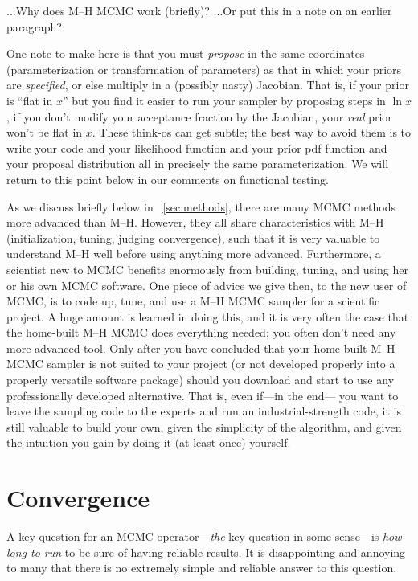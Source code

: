 \documentclass[12pt,twoside,pdftex]{article}
\begin{document}
...Why does M--H MCMC work (briefly)? ...Or put this in a note on an earlier paragraph?

One note to make here
  is that you must \emph{propose}
  in the same coordinates (parameterization or transformation of parameters)
  as that in which your priors are \emph{specified},
  or else multiply in a (possibly nasty) Jacobian.
That is, if your prior is ``flat in $x$''
  but you find it easier to run your sampler by proposing steps in $\ln x$,
  if you don't modify your acceptance fraction by the Jacobian,
  your \emph{real} prior won't be flat in $x$.
These think-os can get subtle;
  the best way to avoid them
  is to write your code and your likelihood function
  and your prior pdf function and your proposal distribution
  all in precisely the same parameterization.
We will return to this point below in our comments on functional testing.

As we discuss briefly below in \sectionname~\ref{sec:methods},
  there are many MCMC methods more advanced than M--H.
However, they all share characteristics with M--H
  (initialization, tuning, judging convergence),
  such that it is very valuable to understand M--H well before using anything more advanced.
Furthermore, a scientist new to MCMC benefits enormously from
  building, tuning, and using her or his own MCMC software.
One piece of advice we give then,
  to the new user of MCMC,
  is to code up, tune, and use a M--H MCMC sampler for a scientific project.
A huge amount is learned in doing this,
  and it is very often the case that the home-built M--H MCMC does everything needed;
  you often don't need any more advanced tool.
Only after you have concluded that your home-built M--H MCMC sampler
  is not suited to your project
  (or not developed properly into a properly versatile software package)
  should you download and start to use any professionally developed alternative.
That is, even if---in the end---%
  you want to leave the sampling code to the experts and run an industrial-strength code,
  it is still valuable to build your own,
  given the simplicity of the algorithm,
  and given the intuition you gain by doing it (at least once) yourself.

\section{Convergence}

A key question for an MCMC operator---\emph{the} key question in some
sense---is \emph{how long to run} to be sure of having reliable
results.
It is disappointing and annoying to many that there is no extremely
simple and reliable answer to this question.
\end{document}
